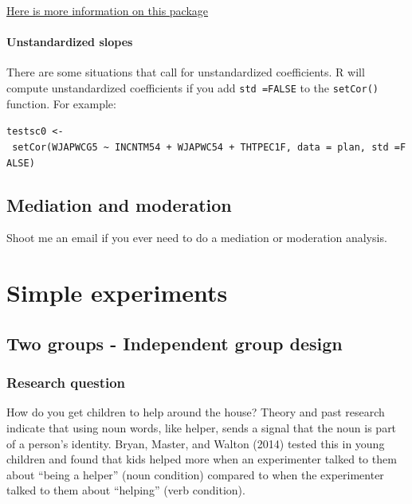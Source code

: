 \documentclass[
]{book}
\begin{document}
\href{https://cran.r-project.org/web/packages/apaTables/vignettes/apaTables.html}{Here is more information on this package}

\hypertarget{unstandardized-slopes}{%
\subsubsection{Unstandardized slopes}\label{unstandardized-slopes}}

There are some situations that call for unstandardized coefficients. R will compute unstandardized coefficients if you add \texttt{std\ =FALSE} to the \texttt{setCor()} function. For example:

\texttt{testsc0\ \textless{}-\ setCor(WJAPWCG5\ \textasciitilde{}\ INCNTM54\ +\ WJAPWC54\ +\ THTPEC1F,\ data\ =\ plan,\ std\ =FALSE)}

\hypertarget{mediation-and-moderation}{%
\section{Mediation and moderation}\label{mediation-and-moderation}}

Shoot me an email if you ever need to do a mediation or moderation analysis.

\hypertarget{simple-experiments}{%
\chapter{Simple experiments}\label{simple-experiments}}

\hypertarget{two-groups---independent-group-design}{%
\section{Two groups - Independent group design}\label{two-groups---independent-group-design}}

\hypertarget{research-question}{%
\subsection{Research question}\label{research-question}}

How do you get children to help around the house? Theory and past research indicate that using noun words, like helper, sends a signal that the noun is part of a person's identity. Bryan, Master, and Walton (2014) tested this in young children and found that kids helped more when an experimenter talked to them about ``being a helper'' (noun condition) compared to when the experimenter talked to them about ``helping'' (verb condition).
\end{document}
